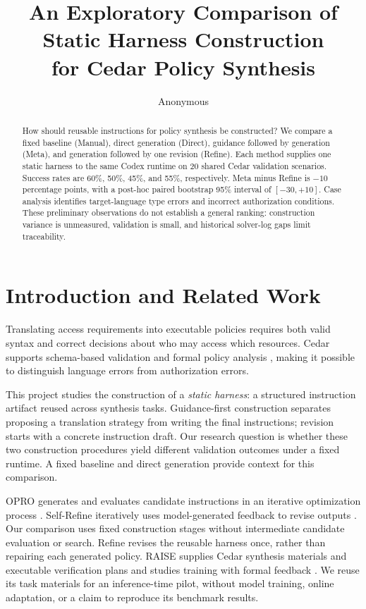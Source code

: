 \documentclass[11pt]{article}
\title{An Exploratory Comparison of Static Harness Construction\\for Cedar Policy Synthesis}
\author{Anonymous}
\begin{document}
\maketitle

\begin{abstract}
How should reusable instructions for policy synthesis be constructed? We compare a fixed baseline (Manual), direct generation (Direct), guidance followed by generation (Meta), and generation followed by one revision (Refine). Each method supplies one static harness to the same Codex runtime on 20 shared Cedar validation scenarios. Success rates are 60\%, 50\%, 45\%, and 55\%, respectively. Meta minus Refine is $-10$ percentage points, with a post-hoc paired bootstrap 95\% interval of $[-30,+10]$. Case analysis identifies target-language type errors and incorrect authorization conditions. These preliminary observations do not establish a general ranking: construction variance is unmeasured, validation is small, and historical solver-log gaps limit traceability.
\end{abstract}

\section{Introduction and Related Work}
Translating access requirements into executable policies requires both valid syntax and correct decisions about who may access which resources. Cedar supports schema-based validation and formal policy analysis \citep{cutler2024cedar}, making it possible to distinguish language errors from authorization errors.

This project studies the construction of a \emph{static harness}: a structured instruction artifact reused across synthesis tasks. Guidance-first construction separates proposing a translation strategy from writing the final instructions; revision starts with a concrete instruction draft. Our research question is whether these two construction procedures yield different validation outcomes under a fixed runtime. A fixed baseline and direct generation provide context for this comparison.

OPRO generates and evaluates candidate instructions in an iterative optimization process \citep{yang2024opro}. Self-Refine iteratively uses model-generated feedback to revise outputs \citep{madaan2023selfrefine}. Our comparison uses fixed construction stages without intermediate candidate evaluation or search. Refine revises the reusable harness once, rather than repairing each generated policy. RAISE supplies Cedar synthesis materials and executable verification plans and studies training with formal feedback \citep{zhou2026raise}. We reuse its task materials for an inference-time pilot, without model training, online adaptation, or a claim to reproduce its benchmark results.
\end{document}
